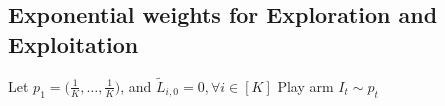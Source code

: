 \subsection{Exponential weights for Exploration and Exploitation} %

\begin{alg}[Exp3] \leavevmode
    \begin{framed}
        \begin{algorithmic}
            \State Let $p_1=\big(\frac{1}{K},\dots,\frac{1}{K}\big)$,
                and $\tilde L_{i,0}=0, \forall i\in [K]$
                \State Play arm $I_t\sim p_t$
            \EndFor
        \end{algorithmic}
    \end{framed}
\end{alg}
